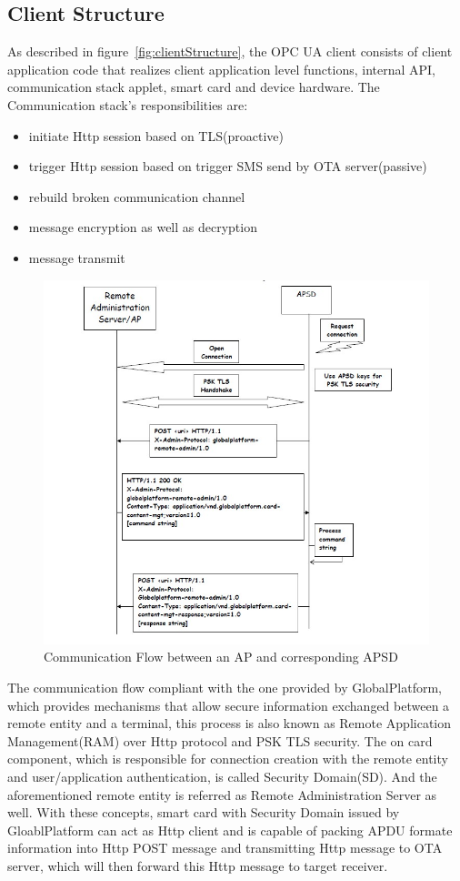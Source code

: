 \subsection{Client Structure}
As described in figure~\ref{fig:clientStructure}, the OPC UA client consists of client application code that realizes client application level functions, internal API, communication stack applet, smart card and device hardware. The Communication stack's responsibilities are:
\begin{itemize}
  \item initiate Http session based on TLS(proactive)
  \item trigger Http session based on trigger SMS send by OTA server(passive)
  \item rebuild broken communication channel
  \item message encryption as well as decryption
  \item message transmit
\end{itemize}

\begin{figure}
	\centering
	\includegraphics[width=1.2\textwidth]{apsd.jpg}
		\caption{Communication Flow between an AP and corresponding APSD\cite{ramGP}}
	\label{fig:apsd}
\end{figure}
The communication flow compliant with the one provided by GlobalPlatform, which provides mechanisms that allow secure information exchanged between a remote entity and a terminal, this process is also known as Remote Application Management(RAM) over Http protocol and PSK TLS security. The on card component, which is responsible for connection creation with the remote entity and user/application authentication, is called Security Domain(SD). And the aforementioned remote entity  is  referred as Remote Administration Server as well. With these concepts, smart card with Security Domain issued  by GloablPlatform can act as Http client and is capable of packing APDU formate information into Http POST message and transmitting Http message to OTA server, which will then forward this Http message to target receiver.\cite{ramGP}
 
